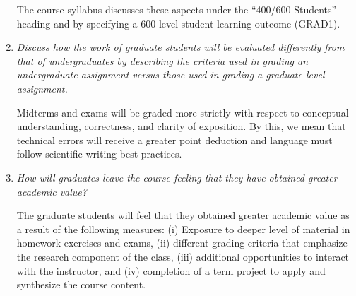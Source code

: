 \documentclass[11pt,onecolumn]{article}
\begin{document}
\begin{enumerate}
  The course syllabus discusses these aspects under the ``400/600 Students'' heading and by specifying a 600-level student learning outcome (\textsc{GRAD1}).

\item \emph{Discuss how the work of graduate students will be evaluated differently from that of undergraduates by describing the criteria used in grading an undergraduate assignment versus those used in grading a graduate level assignment.}

  Midterms and exams will be graded more strictly with respect to conceptual understanding, correctness, and clarity of exposition. By this, we mean that technical errors will receive a greater point deduction and language must follow scientific writing best practices.

\item \emph{How will graduates leave the course feeling that they have obtained greater academic value?}

The graduate students will feel that they obtained greater academic value as a result of the following measures: (i) Exposure to deeper level of material in homework exercises and exams, (ii) different grading criteria that emphasize the research component of the class, (iii) additional opportunities to interact with the instructor, and (iv) completion of a term project to apply and synthesize the course content.
  
\end{enumerate}
\end{document}
